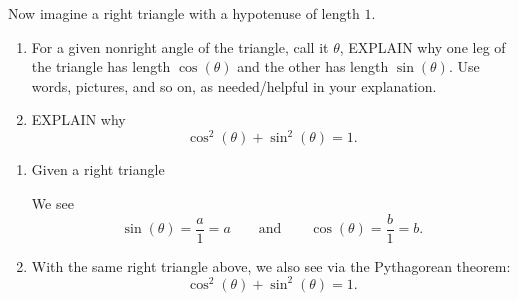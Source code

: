 \documentclass[handout,noauthor,nooutcomes,12pt,hints]{ximera}
\begin{document}
\begin{question}
  Now imagine a right triangle with a hypotenuse of length $1$. 
  \begin{enumerate}
  \item For a given nonright angle of the triangle, call it $\theta$,
    EXPLAIN why one leg of the triangle has length $\cos(\theta)$ and
    the other has length $\sin(\theta)$.  Use words, pictures, and so
    on, as needed/helpful in your explanation.
  \item EXPLAIN why
    \[
    \cos^2(\theta) + \sin^2(\theta) = 1.
    \]
  \end{enumerate}
  \begin{freeResponse}
    \begin{enumerate}
    \item Given a right triangle
    \begin{center}
    \end{center}
    We see
    \[
    \sin(\theta) = \frac{a}{1} = a\qquad \text{and}\qquad \cos(\theta) = \frac{b}{1} = b.
    \]
  \item With the same right triangle above, we also see via the Pythagorean theorem:
    \[
    \cos^2(\theta) + \sin^2(\theta) = 1.
    \]
    \end{enumerate}
  \end{freeResponse}
\end{question}
\mynewpage
\end{document}
